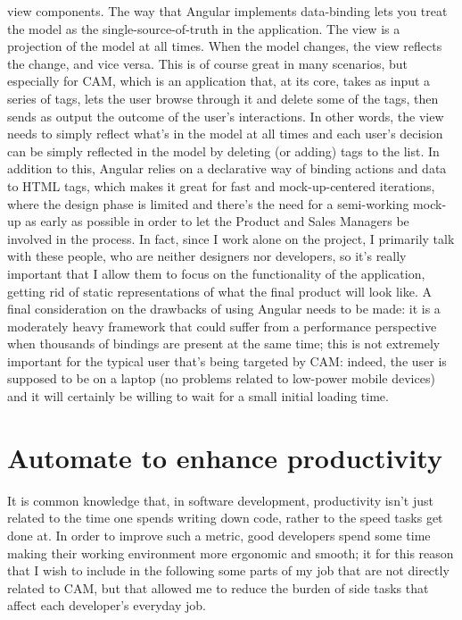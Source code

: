 \documentclass[12pt,oneside,svgnames]{memoir}
\begin{document}
view components. The way that Angular implements data-binding lets you
treat the model as the single-source-of-truth in the application. The
view is a projection of the model at all times. When the model changes,
the view reflects the change, and vice versa. This is of course great in
many scenarios, but especially for CAM, which is an application that, at
its core, takes as input a series of tags, lets the user browse through
it and delete some of the tags, then sends as output the outcome of the
user's interactions. In other words, the view needs to simply reflect
what's in the model at all times and each user's decision can be simply
reflected in the model by deleting (or adding) tags to the list. In
addition to this, Angular relies on a declarative way of binding actions
and data to HTML tags, which makes it great for fast and
mock-up-centered iterations, where the design phase is limited and
there's the need for a semi-working mock-up as early as possible in
order to let the Product and Sales Managers be involved in the process.
In fact, since I work alone on the project, I primarily talk with these
people, who are neither designers nor developers, so it's really
important that I allow them to focus on the functionality of the
application, getting rid of static representations of what the final
product will look like. A final consideration on the drawbacks of using
Angular needs to be made: it is a moderately heavy framework that could
suffer from a performance perspective when thousands of bindings are
present at the same time; this is not extremely important for the
typical user that's being targeted by CAM: indeed, the user is supposed
to be on a laptop (no problems related to low-power mobile devices) and
it will certainly be willing to wait for a small initial loading time.

\section{Automate to enhance
productivity}\label{automate-to-enhance-productivity}

It is common knowledge that, in software development, productivity isn't
just related to the time one spends writing down code, rather to the
speed tasks get done at. In order to improve such a metric, good
developers spend some time making their working environment more
ergonomic and smooth; it for this reason that I wish to include in the
following some parts of my job that are not directly related to CAM, but
that allowed me to reduce the burden of side tasks that affect each
developer's everyday job.
\end{document}
